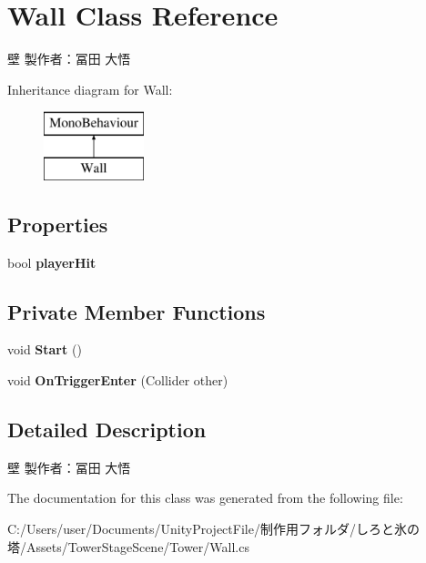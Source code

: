 \hypertarget{class_wall}{}\section{Wall Class Reference}
\label{class_wall}


壁 製作者：冨田 大悟  


Inheritance diagram for Wall\+:\begin{figure}[H]
\begin{center}
\leavevmode
\includegraphics[height=2.000000cm]{class_wall}
\end{center}
\end{figure}
\subsection*{Properties}
\begin{DoxyCompactItemize}
\item 
\mbox{\label{class_wall_ab8dff34d3126b413fab77787b2d68d5d}} 
bool {\bfseries player\+Hit}
\end{DoxyCompactItemize}
\subsection*{Private Member Functions}
\begin{DoxyCompactItemize}
\item 
\mbox{\label{class_wall_af123a73491babd4ac29943922f6d34ee}} 
void {\bfseries Start} ()
\item 
\mbox{\label{class_wall_a8c497423860060f88d9b7e37f0e28b04}} 
void {\bfseries On\+Trigger\+Enter} (Collider other)
\end{DoxyCompactItemize}


\subsection{Detailed Description}
壁 製作者：冨田 大悟 



The documentation for this class was generated from the following file\+:\begin{DoxyCompactItemize}
\item 
C\+:/\+Users/user/\+Documents/\+Unity\+Project\+File/制作用フォルダ/しろと氷の塔/\+Assets/\+Tower\+Stage\+Scene/\+Tower/Wall.\+cs\end{DoxyCompactItemize}
